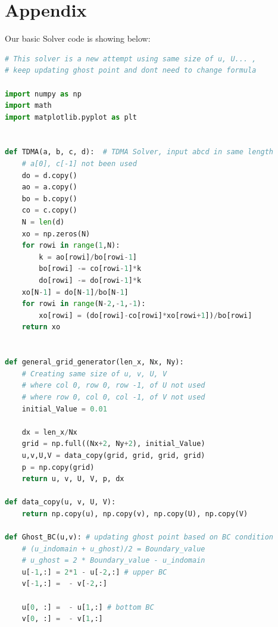 \documentclass[12pt]{article}
\begin{document}









\newpage
\section*{Appendix}
\begin{scriptsize}

Our basic Solver code is showing below:
\begin{lstlisting}[language=python,caption={Lid Driven Cavity Solver}]
# This solver is a new attempt using same size of u, U... , 
# keep updating ghost point and dont need to change formula

import numpy as np
import math
import matplotlib.pyplot as plt


def TDMA(a, b, c, d):  # TDMA Solver, input abcd in same length
    # a[0], c[-1] not been used
    do = d.copy()
    ao = a.copy()
    bo = b.copy()
    co = c.copy()
    N = len(d)
    xo = np.zeros(N)
    for rowi in range(1,N):
        k = ao[rowi]/bo[rowi-1]
        bo[rowi] -= co[rowi-1]*k
        do[rowi] -= do[rowi-1]*k
    xo[N-1] = do[N-1]/bo[N-1]
    for rowi in range(N-2,-1,-1):
        xo[rowi] = (do[rowi]-co[rowi]*xo[rowi+1])/bo[rowi]
    return xo


def general_grid_generator(len_x, Nx, Ny):
    # Creating same size of u, v, U, V
    # where col 0, row 0, row -1, of U not used
    # where row 0, col 0, col -1, of V not used
    initial_Value = 0.01

    dx = len_x/Nx
    grid = np.full((Nx+2, Ny+2), initial_Value)
    u,v,U,V = data_copy(grid, grid, grid, grid)
    p = np.copy(grid)
    return u, v, U, V, p, dx

def data_copy(u, v, U, V):
    return np.copy(u), np.copy(v), np.copy(U), np.copy(V)

def Ghost_BC(u,v): # updating ghost point based on BC condition
    # (u_indomain + u_ghost)/2 = Boundary_value
    # u_ghost = 2 * Boundary_value - u_indomain
    u[-1,:] = 2*1 - u[-2,:] # upper BC
    v[-1,:] =  - v[-2,:]

    u[0, :] =  - u[1,:] # bottom BC
    v[0, :] =  - v[1,:]


\end{lstlisting}
\end{scriptsize}
\end{document}
